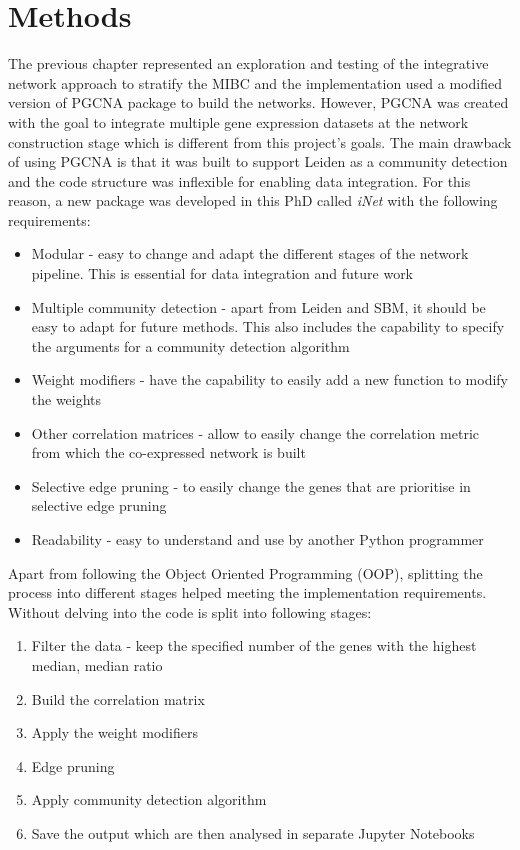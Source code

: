 \section{Methods} \label{s:N_II:methods}

The previous chapter represented an exploration and testing of the integrative network approach to stratify the MIBC and the implementation used a modified version of PGCNA package to build the networks. However, PGCNA was created with the goal to integrate multiple gene expression datasets at the network construction stage which is different from this project's goals. The main drawback of using PGCNA is that it was built to support Leiden as a community detection and the code structure was inflexible for enabling data integration. For this reason, a new package was developed in this PhD called \textit{iNet} with the following requirements: 

\begin{itemize}
    \item Modular - easy to change and adapt the different stages of the network pipeline. This  is essential for data integration and future work
    \item Multiple community detection - apart from Leiden and SBM, it should be easy to adapt for future methods. This also includes the capability to specify the arguments for a community detection algorithm
    \item Weight modifiers - have the capability to easily add a new function to modify the weights
    \item Other correlation matrices - allow to easily change the correlation metric from which the co-expressed network is built
    \item Selective edge pruning - to easily change the genes that are prioritise in selective edge pruning 
    \item Readability - easy to understand and use by another Python programmer
\end{itemize}

Apart from following the Object Oriented Programming (OOP), splitting the process into different stages helped meeting the implementation requirements. Without delving into the code is split into following stages:
\begin{enumerate}
    \item Filter the data - keep the specified number of the genes with the highest median, median ratio
    \item Build the correlation matrix
    \item Apply the weight modifiers
    \item Edge pruning
    \item Apply community detection algorithm
    \item Save the output which are then analysed in separate Jupyter Notebooks
\end{enumerate}

